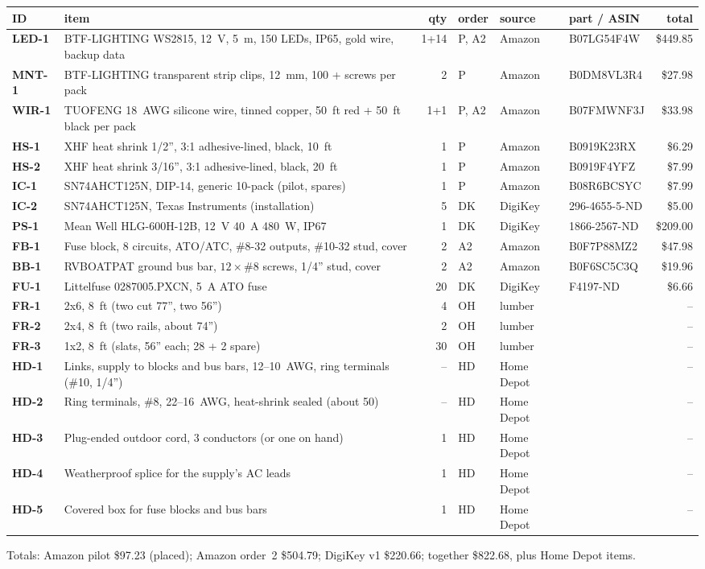\documentclass[11pt,letterpaper]{article}
\newcommand{\id}[1]{\textsf{\textbf{#1}}}  %
\begin{document}
\begin{center}
\small
\begin{tabularx}{\linewidth}{@{}l>{\raggedright\arraybackslash}Xrlll r@{}}
  \toprule
  ID & item & qty & order & source & part / ASIN & total \\
  \midrule
  \id{LED-1} & BTF-LIGHTING WS2815, \SI{12}{V}, \SI{5}{m}, 150 LEDs, IP65, gold wire, backup data & 1+14 & P, A2 & Amazon & B07LG54F4W & \$449.85 \\
  \id{MNT-1} & BTF-LIGHTING transparent strip clips, 12~mm, 100 + screws per pack & 2 & P & Amazon & B0DM8VL3R4 & \$27.98 \\
  \id{WIR-1} & TUOFENG 18~AWG silicone wire, tinned copper, 50~ft red + 50~ft black per pack & 1+1 & P, A2 & Amazon & B07FMWNF3J & \$33.98 \\
  \id{HS-1} & XHF heat shrink 1/2'', 3:1 adhesive-lined, black, 10~ft & 1 & P & Amazon & B0919K23RX & \$6.29 \\
  \id{HS-2} & XHF heat shrink 3/16'', 3:1 adhesive-lined, black, 20~ft & 1 & P & Amazon & B0919F4YFZ & \$7.99 \\
  \id{IC-1} & SN74AHCT125N, DIP-14, generic 10-pack (pilot, spares) & 1 & P & Amazon & B08R6BCSYC & \$7.99 \\
  \id{IC-2} & SN74AHCT125N, Texas Instruments (installation) & 5 & DK & DigiKey & 296-4655-5-ND & \$5.00 \\
  \id{PS-1} & Mean Well HLG-600H-12B, \SI{12}{V} \SI{40}{A} \SI{480}{W}, IP67 & 1 & DK & DigiKey & 1866-2567-ND & \$209.00 \\
  \id{FB-1} & Fuse block, 8 circuits, ATO/ATC, \#8-32 outputs, \#10-32 stud, cover & 2 & A2 & Amazon & B0F7P88MZ2 & \$47.98 \\
  \id{BB-1} & RVBOATPAT ground bus bar, $12\times$\#8 screws, 1/4'' stud, cover & 2 & A2 & Amazon & B0F6SC5C3Q & \$19.96 \\
  \id{FU-1} & Littelfuse 0287005.PXCN, \SI{5}{A} ATO fuse & 20 & DK & DigiKey & F4197-ND & \$6.66 \\
  \midrule
  \id{FR-1} & 2x6, 8~ft (two cut 77'', two 56'') & 4 & OH & lumber & & -- \\
  \id{FR-2} & 2x4, 8~ft (two rails, about 74'') & 2 & OH & lumber & & -- \\
  \id{FR-3} & 1x2, 8~ft (slats, 56'' each; 28 + 2 spare) & 30 & OH & lumber & & -- \\
  \midrule
  \id{HD-1} & Links, supply to blocks and bus bars, 12--10~AWG, ring terminals (\#10, 1/4'') & -- & HD & Home Depot & & -- \\
  \id{HD-2} & Ring terminals, \#8, 22--16~AWG, heat-shrink sealed (about 50) & -- & HD & Home Depot & & -- \\
  \id{HD-3} & Plug-ended outdoor cord, 3 conductors (or one on hand) & 1 & HD & Home Depot & & -- \\
  \id{HD-4} & Weatherproof splice for the supply's AC leads & 1 & HD & Home Depot & & -- \\
  \id{HD-5} & Covered box for fuse blocks and bus bars & 1 & HD & Home Depot & & -- \\
  \bottomrule
\end{tabularx}
\end{center}

\noindent Totals: Amazon pilot \$97.23 (placed); Amazon order~2 \$504.79; DigiKey v1 \$220.66; together \$822.68,
plus Home Depot items.
\end{document}

